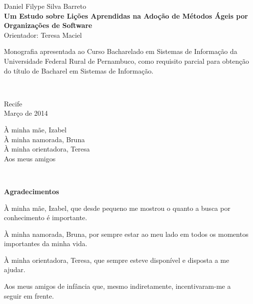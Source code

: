 %
\hyphenation{}

\vspace*{0.0cm}
{\center
{\Large Daniel Filype Silva Barreto}\\[2.4cm]
{\huge \bf Um Estudo sobre Lições Aprendidas na Adoção de Métodos Ágeis por Organizações de Software}\\[2.0cm]
{\Large Orientador: Teresa Maciel}}\\[2.0cm]

{\raggedleft
\begin{minipage}[t]{8.3cm}
\setlength{\baselineskip}{0.25in}
Monografia apresentada ao Curso Bacharelado em Sistemas de Informação  da Universidade Federal Rural de Pernambuco, como requisito parcial para obtenção do título de Bacharel em Sistemas de Informação.\end{minipage}\\[2cm]}
\vspace{3cm}
{\center Recife \\[3mm]
Março de 2014 \\}

\newpage
\vspace*{18cm}
{\raggedleft
\begin{minipage}[t]{6.0cm}
\setlength{\baselineskip}{0.25in}
À minha mãe, Izabel\\
À minha namorada, Bruna\\
À minha orientadora, Teresa\\
Aos meus amigos\\
\end{minipage}\\[2cm]}



\newpage
\begin{center}
{\Large \bf Agradecimentos}
\end{center}
\vspace*{-0.06in}

À minha mãe, Izabel, que desde pequeno me mostrou o quanto a busca por conhecimento é importante.

À minha namorada, Bruna, por sempre estar ao meu lado em todos os momentos importantes da minha vida.

À minha orientadora, Teresa, que sempre esteve disponível e disposta a me ajudar.

Aos meus amigos de infância que, mesmo indiretamente, incentivaram-me a seguir em frente.


